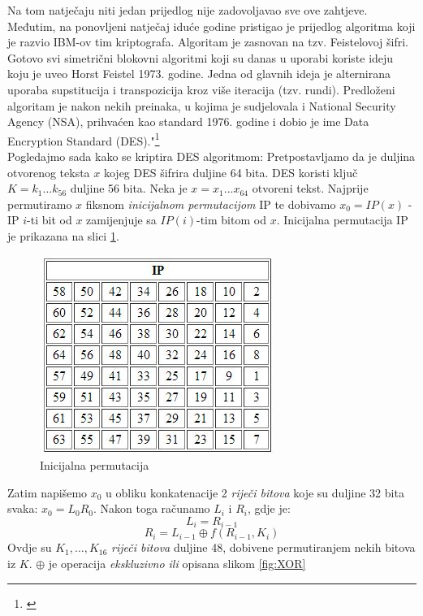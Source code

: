 \documentclass[a4paper,oneside,12pt]{memoir} %
\begin{document}
\begin{spacing}{1.5}
Na tom natječaju niti jedan prijedlog nije zadovoljavao sve ove zahtjeve. Međutim, na ponovljeni natječaj iduće godine pristigao je prijedlog algoritma koji je razvio IBM-ov tim kriptografa. Algoritam je zasnovan na tzv. Feistelovoj šifri. Gotovo svi simetrični blokovni algoritmi koji su danas u uporabi koriste ideju koju je uveo Horst Feistel 1973. godine. Jedna od glavnih ideja je alternirana uporaba supstitucija i transpozicija kroz više iteracija (tzv. rundi).
Predloženi algoritam je nakon nekih preinaka, u kojima je sudjelovala i National Security Agency (NSA), prihvaćen kao standard 1976. godine i dobio je ime Data Encryption Standard (DES)."\footnote{\cite[str. ~56-57]{duje}}\\
Pogledajmo sada kako se kriptira DES algoritmom:
Pretpostavljamo da je duljina otvorenog teksta $x$ kojeg DES šifrira duljine 64 bita. DES koristi ključ $K=k_1...k_{56}$ duljine 56 bita.
Neka je $x=x_1...x_{64}$ otvoreni tekst. Najprije permutiramo $x$ fiksnom \textit{inicijalnom permutacijom} IP te dobivamo $x_0=IP(x)$ - IP $i$-ti bit od $x$ zamijenjuje sa $IP(i)$-tim bitom od $x$. Inicijalna permutacija IP je prikazana na slici \ref{fig:IP}.

\begin{figure}[h!t]
\centering \includegraphics[scale=1]{IP.jpg}
\caption{Inicijalna permutacija}
\label{fig:IP}
\end{figure}

Zatim napišemo $x_0$ u obliku konkatenacije 2 \textit{riječi bitova} koje su duljine 32 bita svaka: $x_0=L_0R_0$. 
Nakon toga računamo $L_i$ i $R_i$, gdje je:
\[L_i=R_{i-1}\]
\[R_i=L_{i-1} \oplus f(R_{i-1}, K_i)\]
Ovdje su $K_1,...,K_{16}$ \textit{riječi bitova} duljine 48, dobivene permutiranjem nekih bitova iz $K$. $\oplus$ je operacija \textit{ekskluzivno ili} opisana slikom \ref{fig:XOR}


\end{spacing}
\end{document}
